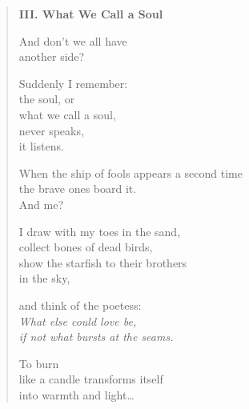 \begin{verse}
\clearpage

{\bfseries III. What We Call a Soul}

And don't we all have\\
another side?

Suddenly I remember:\\
the soul, or\\
what we call a soul,\\
never speaks,\\
it listens.

When the ship of fools appears a second time\\
the brave ones board it.\\
And me?

I draw with my toes in the sand,\\
collect bones of dead birds,\\
show the starfish to their brothers\\
in the sky,

and think of the poetess:\label{poetess}\\
{\itshape What else could love be,\\
if not what bursts at the seams.}

To burn\\
like a candle transforms itself\\
into warmth and light\ldots

\end{verse}

